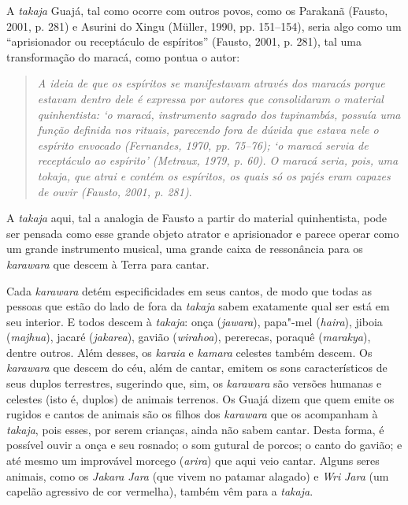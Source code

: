 A \emph{takaja} Guajá, tal como ocorre com outros povos, como os
Parakanã (Fausto, 2001, p. 281) e Asurini do Xingu (Müller, 1990,
pp. 151--154), seria algo como um ``aprisionador ou receptáculo de
espíritos'' (Fausto, 2001, p. 281), tal uma transformação do maracá, como
pontua o autor:

\begin{quote}
\emph{A ideia de que os espíritos se manifestavam através dos maracás porque
estavam dentro dele é expressa por autores que consolidaram o material
quinhentista: `o maracá, instrumento sagrado dos tupinambás, possuía uma
função definida nos rituais, parecendo fora de dúvida que estava nele o
espírito envocado (Fernandes, 1970, pp. 75--76); `o maracá servia de
receptáculo ao espírito' (Metraux, 1979, p. 60). O maracá seria, pois, uma
tokaja, que atrai e contém os espíritos, os quais só os pajés eram
capazes de ouvir (Fausto, 2001, p. 281)}.
\end{quote}

A \emph{takaja} aqui, tal a analogia de Fausto a partir do material
quinhentista, pode ser pensada como esse grande objeto atrator e
aprisionador e parece operar como um grande instrumento musical, uma
grande caixa de ressonância para os \emph{karawara} que descem à Terra
para cantar.

Cada \emph{karawara} detém especificidades em seus cantos, de modo que
todas as pessoas que estão do lado de fora da \emph{takaja} sabem
exatamente qual ser está em seu interior. E todos descem à
\emph{takaja}: onça (\emph{jawara}), papa"-mel (\emph{haira}), jiboia
(\emph{majhua}), jacaré (\emph{jakarea}), gavião (\emph{wirahoa}),
pererecas, poraquê (\emph{marakya}), dentre outros. Além desses, os
\emph{karaia} e \emph{kamara} celestes também descem. Os \emph{karawara}
que descem do céu, além de cantar, emitem os sons característicos de
seus duplos terrestres, sugerindo que, sim, os \emph{karawara} são
versões humanas e celestes (isto é, duplos) de animais terrenos. Os
Guajá dizem que quem emite os rugidos e cantos de animais são os filhos
dos \emph{karawara} que os acompanham à \emph{takaja}, pois esses, por
serem crianças, ainda não sabem cantar. Desta forma, é possível ouvir a
onça e seu rosnado; o som gutural de porcos; o canto do gavião; e até
mesmo um improvável morcego (\emph{arira}) que aqui veio cantar. Alguns
seres animais, como os \emph{Jakara} \emph{Jara} (que vivem no patamar
alagado) e \emph{Wri} \emph{Jara} (um capelão agressivo de cor
vermelha), também vêm para a \emph{takaja}.

